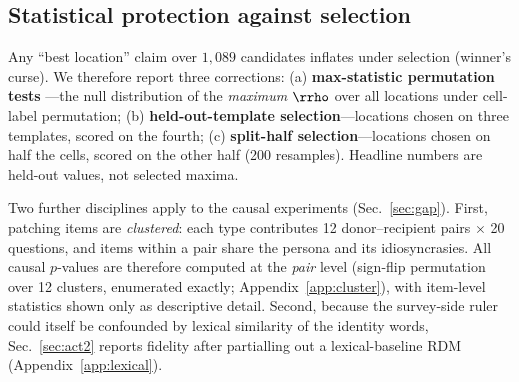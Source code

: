 \subsection{Statistical protection against selection}
\label{sec:setup-selection}
Any ``best location'' claim over $1{,}089$ candidates inflates under
selection (winner's curse). We therefore report three corrections:
(a) \textbf{max-statistic permutation tests} \citep{nichols2002}---the
null distribution of the \emph{maximum} $\rrho$ over all locations under
cell-label permutation; (b) \textbf{held-out-template selection}---locations chosen
on three templates, scored on the fourth; (c) \textbf{split-half
selection}---locations chosen on half the cells, scored on the other half
(200 resamples). Headline numbers are held-out values, not selected
maxima.

Two further disciplines apply to the causal experiments
(Sec.~\ref{sec:gap}). First, patching items are \emph{clustered}: each
type contributes 12 donor--recipient pairs $\times$ 20 questions, and
items within a pair share the persona and its idiosyncrasies. All causal
$p$-values are therefore computed at the \emph{pair} level (sign-flip
permutation over 12 clusters, enumerated exactly;
Appendix~\ref{app:cluster}), with item-level statistics shown only as
descriptive detail. Second, because the survey-side ruler could itself be
confounded by lexical similarity of the identity words,
Sec.~\ref{sec:act2} reports fidelity after partialling out a
lexical-baseline RDM (Appendix~\ref{app:lexical}).
